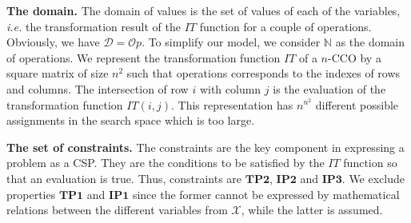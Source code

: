 \documentclass[submission,copyright,creativecommons]{eptcs}
\newcommand{\Nat}{{\mathbb N}}
\begin{document}
\medskip
\noindent\textbf{\textbf{The domain.}} The domain of values is the set of values of each of the variables, \textit{i.e.} the transformation result of the $IT$ function for a couple of operations. Obviously,    we have $\mathcal{D}=\mathcal{O}p$. To simplify our model, we consider  $\Nat$ as the domain of operations. We represent the transformation function  $IT$ of a $n$-CCO by a square matrix of size $n^2$   such that operations corresponds to the indexes of rows and columns. The intersection of row $i$ with column $j$ is the evaluation of the transformation function $IT(i, j)$.  This representation has   $n^{n^{2}}$ different possible assignments in the search space which is too large.

\medskip
\noindent\textbf{\textbf{The set of constraints.}}
The constraints are the key component in 
expressing a problem as a CSP. They are the conditions to be satisfied by the $IT$ function so that an evaluation is true. Thus,  constraints are  $\mathbf{TP2}$,   $\mathbf{IP2}$ and $\mathbf{IP3}$. We exclude   properties  $\mathbf{TP1}$  and $\mathbf{IP1}$ since the former cannot be expressed by mathematical relations between the different variables from $\mathcal{X}$, while the latter is assumed. 
  
\end{document}
